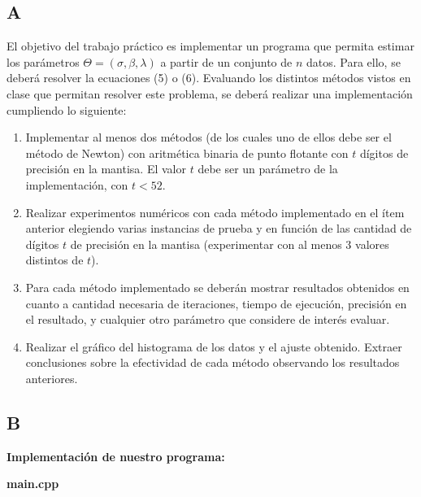 \documentclass[10pt, a4paper]{article}
\begin{document}
\subsection{A}
El objetivo del trabajo pr\'actico es implementar un programa que permita estimar los par\'ametros $\Theta=(\sigma,\beta,\lambda)$ a partir de un conjunto de $n$ datos. Para ello, se deber\'a resolver la ecuaciones (5) o (6).
Evaluando los distintos m\'etodos vistos en clase que permitan resolver este problema, se deber\'a realizar una implementaci\'on cumpliendo lo siguiente:
\begin{enumerate} 
\item Implementar al menos dos m\'etodos (de los cuales uno de ellos debe ser el m\'etodo de Newton) con aritm\'etica binaria de punto flotante con $t$ d\'igitos de precisi\'on en la mantisa. El valor $t$ debe ser un par\'ametro de la implementaci\'on, con $t<52$.
\item  Realizar experimentos num\'ericos con cada m\'etodo implementado en el \'item anterior elegiendo varias instancias de prueba y en funci\'on de las cantidad de d\'igitos $t$ de precisi\'on en la mantisa (experimentar con al menos 3 valores distintos de $t$).
\item Para cada m\'etodo implementado se deber\'an mostrar resultados obtenidos en cuanto a cantidad necesaria de iteraciones, tiempo de ejecuci\'on, precisi\'on en el resultado, y cualquier otro par\'ametro que considere de inter\'es evaluar.
\item Realizar el gr\'afico del histograma de los datos y el ajuste obtenido. Extraer conclusiones sobre la efectividad de cada m\'etodo observando los resultados anteriores.  
\end{enumerate}
\subsection{B}

\large{\textbf{Implementaci\'on de nuestro programa:}}\newline

\centerline{\large{\textbf{main.cpp}}}

\end{document}
